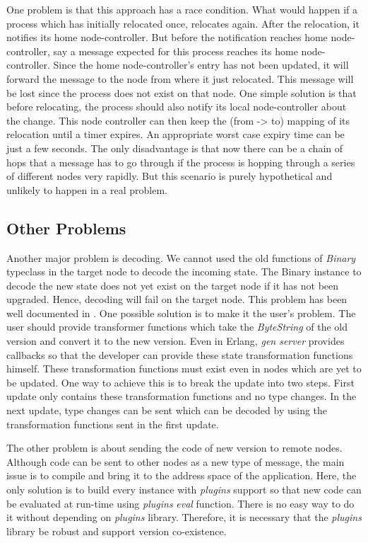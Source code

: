One problem is that this approach has a race condition. What would
happen if a process which has initially relocated once, relocates
again. After the relocation, it notifies its home node-controller. But
before the notification reaches home node-controller, say a message
expected for this process reaches its home node-controller. Since the
home node-controller's entry has not been updated, it will forward the
message to the node from where it just relocated. This message will be
lost since the process does not exist on that node. One simple
solution is that before relocating, the process should also notify its
local node-controller about the change. This node controller can then
keep the (from -> to) mapping of its relocation until a timer
expires. An appropriate worst case expiry time can be just a few
seconds. The only disadvantage is that now there can be a chain of
hops that a message has to go through if the process is hopping
through a series of different nodes very rapidly. But this scenario is
purely hypothetical and unlikely to happen in a real problem.

\subsection{Other Problems}

Another major problem is decoding.  We cannot used the old functions
of \emph{Binary} typeclass in the target node to decode the incoming
state. The Binary instance to decode the new state does not yet exist
on the target node if it has not been upgraded. Hence, decoding will
fail on the target node. This problem has been well documented in
\cite{epstein_functional_2011}. One possible solution is to make it
the user's problem. The user should provide transformer functions
which take the \emph{ByteString} of the old version and convert it to
the new version.  Even in Erlang, \emph{gen server} provides callbacks
so that the developer can provide these state transformation functions
himself. These transformation functions must exist even in nodes
which are yet to be updated. One way to achieve this is to break the
update into two steps. First update only contains these transformation
functions and no type changes. In the next update, type changes can be
sent which can be decoded by using the transformation functions sent
in the first update.

The other problem is about sending the code of new version to remote
nodes.  Although code can be sent to other nodes as a new type of
message, the main issue is to compile and bring it to the address
space of the application.  Here, the only solution is to build every
instance with \emph{plugins} support so that new code can be evaluated
at run-time using \emph{plugins} \emph{eval} function. There is no
easy way to do it without depending on \emph{plugins}
library. Therefore, it is necessary that the \emph{plugins} library be
robust and support version co-existence.

